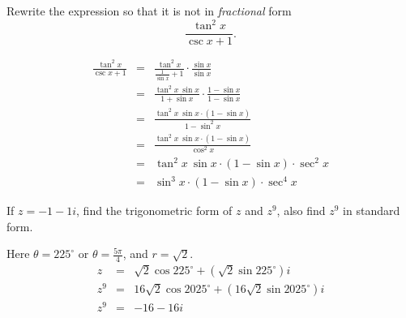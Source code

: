 \documentclass[12pt,addpoints, answers, fleqn]{exam}
\begin{document}
\begin{questions}
\question Rewrite the expression so that it is not in \emph{fractional} form
\[
\frac{\tan^2 x}{\csc x + 1}.
\]
\begin{solution} 
\begin{eqnarray*}
\frac{\tan^2 x}{\csc x + 1} &=& \frac{\tan^2 x}{\displaystyle \frac{1}{\sin x} + 1} \cdot \frac{\sin x }{\sin x }\\
&=& \frac{\tan^2 x \ \sin x}{1 + \sin x} \cdot \frac{1 - \sin x}{1 - \sin x}\\
&=& \frac{\tan^2 x \ \sin x \cdot \left( 1 - \sin x \right)}{1 - \sin^2 x}\\
&=& \frac{\tan^2 x \ \sin x \cdot \left( 1 - \sin x \right)}{\cos^2 x}\\
&=& \boxed{\tan^2 x \ \sin x \cdot \left( 1 - \sin x \right) \cdot \sec^2 x}\\
&=& \boxed{\sin^3 x \cdot \left( 1 - \sin x \right) \cdot \sec^4 x}
\end{eqnarray*}
\end{solution}


\question If $z = -1 - 1 i$, find the trigonometric form of $z$ and $z^9$, also find $z^9$ in standard form.
\begin{solution}
Here $\theta = 225^\circ$ or $\theta = \displaystyle \frac{5\pi}{4}$, and $r = \sqrt{2}$.
\begin{eqnarray*}
z &=& \boxed{\sqrt{2} \cos 225^\circ + \left(\sqrt{2} \sin 225^\circ \right)i}\\
z^9 &=& \boxed{16 \sqrt{2} \cos 2025^\circ + \left( 16 \sqrt{2} \sin 2025^\circ \right) i}\\
z^9 &=& \boxed{ -16 - 16i}
\end{eqnarray*}
\end{solution}


\end{questions}
\end{document}
